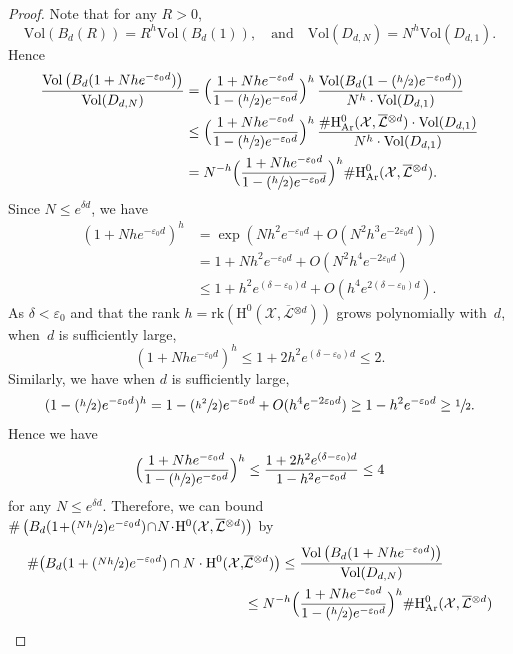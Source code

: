 \documentclass[JEP,XML,SOM,Unicode,published]{cedram}
\newcommand{\Psfrac}[2]{(\sfrac{#1}{#2})}
\theoremstyle{plain}
\theoremstyle{definition}
\newcommand{\ho}{\mathrm{H}}
\newcommand{\X}{\mathcal{X}}
\newcommand{\Li}{\overline{\mathcal{L}}{}}
\begin{document}
\begin{proof}[Proof]
Note that for any $R>0$,
\[
\mathrm{Vol}\left(B_d(R)\right)=R^h\mathrm{Vol}\left(B_d(1)\right),
\quad\text{and}\quad
\mathrm{Vol}(D_{d,N})=N^{h} \mathrm{Vol}(D_{d,1}).
\]
Hence
\begin{align*}
\frac{\mathrm{Vol} \left(B_d(1+Nhe^{-\varepsilon_0 d}) \right)}{\mathrm{Vol}(D_{d,N})}
&=\Bigl(\frac{1+Nhe^{-\varepsilon_0 d}}{1-\Psfrac{h}{2}e^{-\varepsilon_0 d}}\Bigr)^h\,\frac{\mathrm{Vol}(B_d(1-\Psfrac{h}{2}e^{-\varepsilon_0 d}))}{N^h\cdot\mathrm{Vol}(D_{d,1})} \\
&\leq\Bigl(\frac{1+Nhe^{-\varepsilon_0 d}}{1-\Psfrac{h}{2}e^{-\varepsilon_0 d}}\Bigr)^h\,\frac{\#\ho^0_{\mathrm{Ar}}(\X,\Li^{\otimes d})\cdot \mathrm{Vol}(D_{d,1})}{N^{h}\cdot\mathrm{Vol}(D_{d,1})}\\
&=N^{-h}\Bigl(\frac{1+Nhe^{-\varepsilon_0 d}}{1-\Psfrac{h}{2}e^{-\varepsilon_0 d}}\Bigr)^h\#\ho^0_{\mathrm{Ar}}(\X,\Li^{\otimes d}).
\end{align*}
Since $N\leq e^{\delta d}$, we have
\begin{align*}
(1+Nhe^{-\varepsilon_0 d})^h &=\exp\left(Nh^2e^{-\varepsilon_0 d}+ O(N^2h^3e^{-2\varepsilon_0 d})\right)\\
&= 1+Nh^2e^{-\varepsilon_0 d}+O(N^2h^4e^{-2\varepsilon_0 d}) \\
&\leq 1+h^2e^{(\delta-\varepsilon_0) d}+O(h^4e^{2(\delta-\varepsilon_0) d}).
\end{align*}
As $\delta<\varepsilon_0$ and that the rank $h=\mathrm{rk}(\ho^0(\X,\Li^{\otimes d}))$ grows polynomially with~$d$, when~$d$ is sufficiently large,
\[
(1+Nhe^{-\varepsilon_0 d})^h \leq 1+2h^2e^{(\delta-\varepsilon_0) d}\leq 2.
\]
Similarly, we have when $d$ is sufficiently large,
\[
(1-\Psfrac{h}{2}e^{-\varepsilon_0 d})^h =1-\Psfrac{h^2}{2}e^{-\varepsilon_0 d}+O(h^4e^{-2\varepsilon_0 d})\geq 1-h^2e^{-\varepsilon_0 d}\geq \sfrac{1}{2}.
\]
Hence we have
\[
\Bigl(\frac{1+Nhe^{-\varepsilon_0 d}}{1-\Psfrac{h}{2}e^{-\varepsilon_0 d}}\Bigr)^h \leq \frac{1+2h^2e^{(\delta-\varepsilon_0) d}}{1-h^2e^{-\varepsilon_0 d}}\leq 4
\]
for any $N\!\leq\! e^{\delta d}$. Therefore, we can bound $\# \left(B_d(1\!+\!\Psfrac{Nh}{2}e^{-\varepsilon_0 d})\!\cap\! N\!\cdot\! \ho^0(\X,\Li^{\otimes d}) \right)$ by
\begin{align*}
\# \bigl(B_d(1+\Psfrac{Nh}{2}e^{-\varepsilon_0 d}) \cap N\cdot \ho^0(\X,&\Li^{\otimes d}) \bigr)
\leq \frac{\mathrm{Vol} \left(B_d(1+Nhe^{-\varepsilon_0 d}) \right)}{\mathrm{Vol}(D_{d,N})} \\
&\leq N^{-h}\Bigl(\frac{1+Nhe^{-\varepsilon_0 d}}{1-\Psfrac{h}{2}e^{-\varepsilon_0 d}} \Bigr)^h\#\ho^0_{\mathrm{Ar}}(\X,\Li^{\otimes d})\\

\end{align*}
\end{proof}
\end{document}
